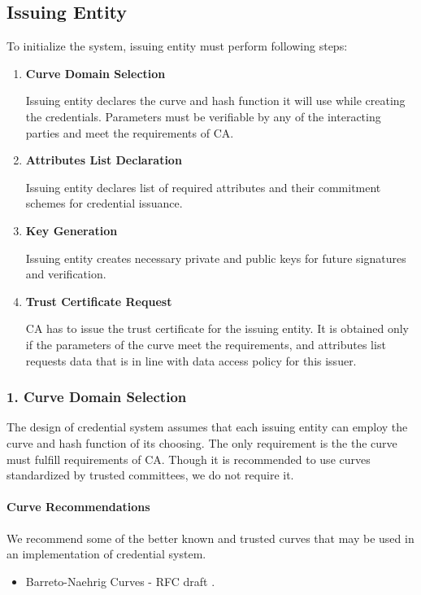\subsection{Issuing Entity} \label{setup:issuer}
To initialize the system, issuing entity must perform following steps:
\begin{enumerate}
    \item \textbf{Curve Domain Selection}
    
    Issuing entity declares the curve and hash function it will use while creating the credentials. Parameters must be verifiable by any of the interacting parties and meet the requirements of CA.
    
    \item \textbf{Attributes List Declaration}
    
    Issuing entity declares list of required attributes and their commitment schemes for credential issuance.
  
    \item \textbf{Key Generation}
    
    Issuing entity creates necessary private and public keys for future signatures and verification.
    
    \item \textbf{Trust Certificate Request}
    
    CA has to issue the trust certificate for the issuing entity. It is obtained only if the parameters of the curve meet the requirements, and attributes list requests data that is in line with data access policy for this issuer.
\end{enumerate}


\subsubsection{1. Curve Domain Selection}
The design of credential system assumes that each issuing entity can employ the curve and hash function of its choosing. The only requirement is the the curve must fulfill requirements of CA.  Though it is recommended to use curves standardized by trusted committees, we do not require it. 

\paragraph{Curve Recommendations}
We recommend some of the better known and trusted curves that may be used in an implementation of credential system.
\begin{itemize}[label=$\circ$]
    \item Barreto-Naehrig Curves - RFC draft \cite{kasamatsu-bncurves-02}.
\end{itemize}


